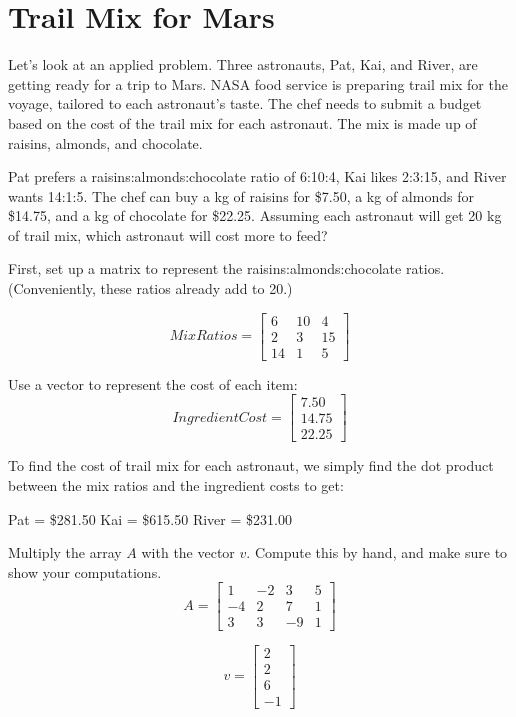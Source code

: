 \section{Trail Mix for Mars}
Let's look at an applied problem. Three astronauts, Pat, Kai, and River, are getting ready for a trip to Mars. NASA food service is preparing trail mix for the voyage, tailored to each astronaut's taste. The chef needs to submit a budget based on the cost of the trail mix for each astronaut. The mix is made up of raisins, almonds, and chocolate.

Pat prefers a raisins:almonds:chocolate ratio of 6:10:4, Kai likes 2:3:15, and River wants 14:1:5. The chef can buy a kg of raisins for \$7.50, a kg of almonds for \$14.75, and a kg of chocolate for \$22.25. Assuming each astronaut will get 20 kg of trail mix, which astronaut will cost more to feed?

First, set up a matrix to represent the raisins:almonds:chocolate ratios. (Conveniently, these ratios already add to 20.)

$$MixRatios = \begin{bmatrix}
6 & 10 & 4  \\
2 & 3 & 15 \\
14 & 1 & 5
\end{bmatrix}$$

Use a vector to represent the cost of each item:
$$IngredientCost = 
\begin{bmatrix}
7.50 \\
14.75 \\
22.25
\end{bmatrix}$$

To find the cost of trail mix for each astronaut, we simply find the dot product between the mix ratios and the ingredient costs to get:

Pat =  \$281.50 \newline
Kai =  \$615.50 \newline
River = \$231.00 \newline


\begin{Exercise}[title={Vector Matrix Multiplication}, label=vector-matrix-multiply01]
Multiply the array $A$ with the vector $v$. Compute this by hand, and make sure to show your computations. 
$$A = \begin{bmatrix}
1 & -2 & 3 & 5  \\
-4 & 2 & 7 & 1 \\
3 & 3  & -9 & 1
\end{bmatrix}$$

$$v = 
\begin{bmatrix}
 2 \\
 2 \\
 6 \\
 -1
 \end{bmatrix}$$
\end{Exercise}


